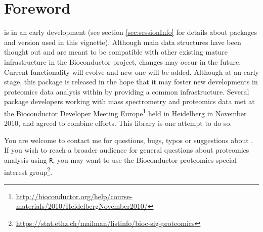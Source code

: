 \section*{Foreword}

 is in an early development %
(see section \ref{sec:sessionInfo} for details about packages and version used in this vignette). 
Although main data structures have been thought out and are meant to be compatible with other existing 
mature infrastructure in the Bioconductor project, changes may occur in the future. 
Current functionality will evolve and new one will be added. 
Although at an early stage, this package is released in the hope that it may foster  
new developments in proteomics data analysis within \R by providing a common infrastructure. 
Several package developers working with mass spectrometry and proteomics data met at the 
Bioconductor Developer Meeting Europe\footnote{\url{http://bioconductor.org/help/course-materials/2010/HeidelbergNovember2010/}} 
held in Heidelberg in November 2010, and agreed to combine efforts. 
This library is one attempt to do so.

\bigskip

You are welcome to contact me for questions, bugs, typos or suggestions about . 
If you wish to reach a broader audience for general questions about proteomics analysis using \texttt{R}, 
you may want to use the Bioconductor proteomics special interest 
group\footnote{\url{https://stat.ethz.ch/mailman/listinfo/bioc-sig-proteomics}}. 
